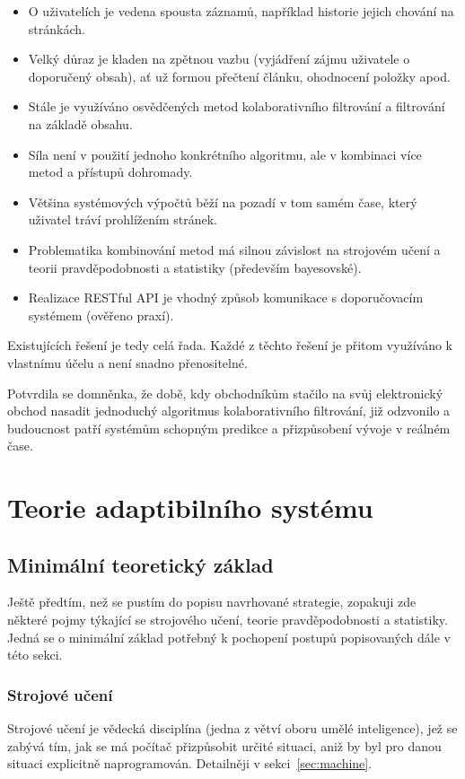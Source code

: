 \documentclass[thesis=M,czech]{FITthesis}[2014/05/07]
\begin{document}
\begin{itemize}
	\item O uživatelích je vedena spousta záznamů, například historie jejich chování na stránkách.
	\item Velký důraz je kladen na zpětnou vazbu (vyjádření zájmu uživatele o doporučený obsah), ať už formou přečtení článku, ohodnocení položky apod.
	\item Stále je využíváno osvědčených metod kolaborativního filtrování a filtrování na základě obsahu.
	\item Síla není v použití jednoho konkrétního algoritmu, ale v kombinaci více metod a přístupů dohromady.
	\item Většina systémových výpočtů běží na pozadí v tom samém čase, který uživatel tráví prohlížením stránek.
	\item Problematika kombinování metod má silnou závislost na strojovém učení a teorii pravděpodobnosti a statistiky (především bayesovské).
	\item Realizace RESTful API je vhodný způsob komunikace s doporučovacím systémem (ověřeno praxí).
\end{itemize}

Existujících řešení je tedy celá řada. Každé z těchto řešení je přitom využíváno k vlastnímu účelu a není snadno přenositelné.

Potvrdila se domněnka, že době, kdy obchodníkům stačilo na svůj elektronický obchod nasadit jednoduchý algoritmus kolaborativního filtrování, již odzvonilo a budoucnost patří systémům schopným predikce a přizpůsobení vývoje v reálném čase. 

\section{Teorie adaptibilního systému}
\label{chap:adapt}

\subsection{Minimální teoretický základ}

Ještě předtím, než se pustím do popisu navrhované strategie, zopakuji zde některé pojmy týkající se strojového učení, teorie pravděpodobnosti a statistiky. Jedná se o minimální základ potřebný k pochopení postupů popisovaných dále v této sekci. 

\subsubsection{Strojové učení}
Strojové učení je vědecká disciplína (jedna z větví oboru umělé inteligence), jež se zabývá tím, jak se má počítač přizpůsobit určité situaci, aniž by byl pro danou situaci explicitně naprogramován. Detailněji v sekci~\ref{sec:machine}.
\end{document}
